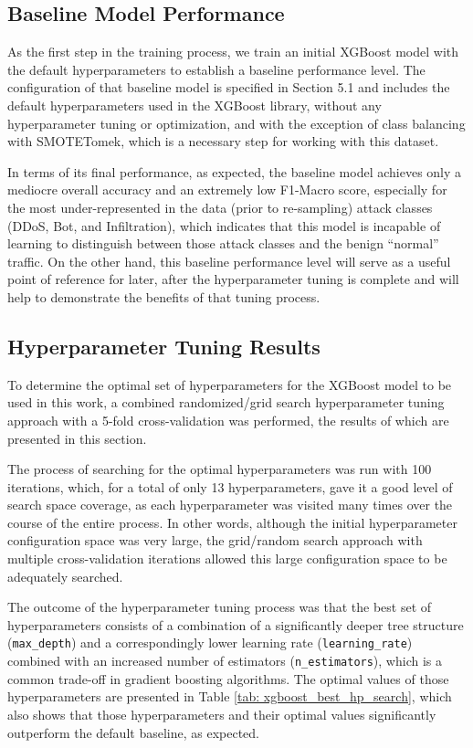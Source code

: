 \subsection{Baseline Model Performance} 

As the first step in the training process, we train an initial XGBoost model with the default hyperparameters to establish a baseline performance level. The configuration of that baseline model is specified in Section 5.1 and includes the default hyperparameters used in the XGBoost library, without any hyperparameter tuning or optimization, and with the exception of class balancing with SMOTETomek, which is a necessary step for working with this dataset.

In terms of its final performance, as expected, the baseline model achieves only a mediocre overall accuracy and an extremely low F1-Macro score, especially for the most under-represented in the data (prior to re-sampling) attack classes (DDoS, Bot, and Infiltration), which indicates that this model is incapable of learning to distinguish between those attack classes and the benign “normal” traffic. On the other hand, this baseline performance level will serve as a useful point of reference for later, after the hyperparameter tuning is complete and will help to demonstrate the benefits of that tuning process.

\subsection{Hyperparameter Tuning Results} 

To determine the optimal set of hyperparameters for the XGBoost model to be used in this work, a combined randomized/grid search hyperparameter tuning approach with a 5-fold cross-validation was performed, the results of which are presented in this section.

The process of searching for the optimal hyperparameters was run with 100 iterations, which, for a total of only 13 hyperparameters, gave it a good level of search space coverage, as each hyperparameter was visited many times over the course of the entire process. In other words, although the initial hyperparameter configuration space was very large, the grid/random search approach with multiple cross-validation iterations allowed this large configuration space to be adequately searched.

The outcome of the hyperparameter tuning process was that the best set of hyperparameters consists of a combination of a significantly deeper tree structure (\texttt{max\_depth}) and a correspondingly lower learning rate (\texttt{learning\_rate}) combined with an increased number of estimators (\texttt{n\_estimators}), which is a common trade-off in gradient boosting algorithms. The optimal values of those hyperparameters are presented in Table \ref{tab: xgboost_best_hp_search}, which also shows that those hyperparameters and their optimal values significantly outperform the default baseline, as expected.

